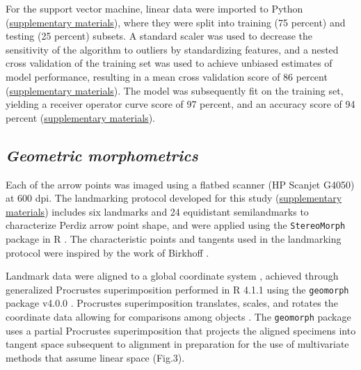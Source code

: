 \documentclass[smallextended]{svjour3}       %
\begin{document}
For the support vector machine, linear data were imported to Python
(\href{https://seldenlab.github.io/perdiz3/}{supplementary materials}),
where they were split into training (75 percent) and testing (25
percent) subsets. A standard scaler was used to decrease the sensitivity
of the algorithm to outliers by standardizing features, and a nested
cross validation of the training set was used to achieve unbiased
estimates of model performance, resulting in a mean cross validation
score of 86 percent
(\href{https://seldenlab.github.io/perdiz3/}{supplementary materials}).
The model was subsequently fit on the training set, yielding a receiver
operator curve score of 97 percent, and an accuracy score of 94 percent
(\href{https://seldenlab.github.io/perdiz3/}{supplementary materials}).

\hypertarget{geometric-morphometrics}{%
\subsection{\texorpdfstring{\emph{Geometric
morphometrics}}{Geometric morphometrics}}\label{geometric-morphometrics}}

Each of the arrow points was imaged using a flatbed scanner (HP Scanjet
G4050) at 600 dpi. The landmarking protocol developed for this study
(\href{https://seldenlab.github.io/perdiz3/}{supplementary materials})
includes six landmarks and 24 equidistant semilandmarks to characterize
Perdiz arrow point shape, and were applied using the
\texttt{StereoMorph} package in R \cite{RN8973}. The characteristic
points and tangents used in the landmarking protocol were inspired by
the work of Birkhoff \cite{RN5700}.

Landmark data were aligned to a global coordinate system
\cite{RN8102,RN8587,RN8384}, achieved through generalized Procrustes
superimposition \cite{RN8525} performed in R 4.1.1 \cite{RN8584} using
the \texttt{geomorph} package v4.0.0 \cite{RN8565}. Procrustes
superimposition translates, scales, and rotates the coordinate data
allowing for comparisons among objects \cite{RN5698,RN8525}. The
\texttt{geomorph} package uses a partial Procrustes superimposition that
projects the aligned specimens into tangent space subsequent to
alignment in preparation for the use of multivariate methods that assume
linear space \cite{RN8511,RN8384} (Fig.3).
\end{document}
